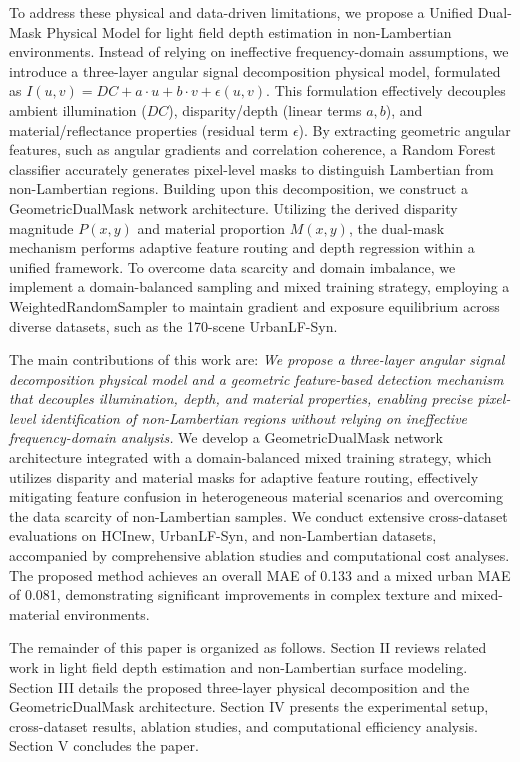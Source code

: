 To address these physical and data-driven limitations, we propose a Unified Dual-Mask Physical Model for light field depth estimation in non-Lambertian environments. Instead of relying on ineffective frequency-domain assumptions, we introduce a three-layer angular signal decomposition physical model, formulated as $I(u,v) = DC + a \cdot u + b \cdot v + \epsilon(u,v)$. This formulation effectively decouples ambient illumination ($DC$), disparity/depth (linear terms $a, b$), and material/reflectance properties (residual term $\epsilon$). By extracting geometric angular features, such as angular gradients and correlation coherence, a Random Forest classifier accurately generates pixel-level masks to distinguish Lambertian from non-Lambertian regions. Building upon this decomposition, we construct a GeometricDualMask network architecture. Utilizing the derived disparity magnitude $P(x,y)$ and material proportion $M(x,y)$, the dual-mask mechanism performs adaptive feature routing and depth regression within a unified framework. To overcome data scarcity and domain imbalance, we implement a domain-balanced sampling and mixed training strategy, employing a WeightedRandomSampler to maintain gradient and exposure equilibrium across diverse datasets, such as the 170-scene UrbanLF-Syn.

The main contributions of this work are:
\textit{ We propose a three-layer angular signal decomposition physical model and a geometric feature-based detection mechanism that decouples illumination, depth, and material properties, enabling precise pixel-level identification of non-Lambertian regions without relying on ineffective frequency-domain analysis.
} We develop a GeometricDualMask network architecture integrated with a domain-balanced mixed training strategy, which utilizes disparity and material masks for adaptive feature routing, effectively mitigating feature confusion in heterogeneous material scenarios and overcoming the data scarcity of non-Lambertian samples.
We conduct extensive cross-dataset evaluations on HCInew, UrbanLF-Syn, and non-Lambertian datasets, accompanied by comprehensive ablation studies and computational cost analyses. The proposed method achieves an overall MAE of 0.133 and a mixed urban MAE of 0.081, demonstrating significant improvements in complex texture and mixed-material environments.

The remainder of this paper is organized as follows. Section II reviews related work in light field depth estimation and non-Lambertian surface modeling. Section III details the proposed three-layer physical decomposition and the GeometricDualMask architecture. Section IV presents the experimental setup, cross-dataset results, ablation studies, and computational efficiency analysis. Section V concludes the paper.

